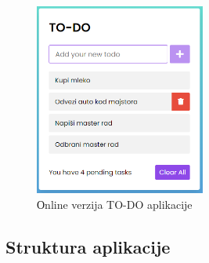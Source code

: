 \documentclass[12pt,oneside]{memoir}
\begin{document}
\begin{figure}[!ht]
  \centering
  \includegraphics[width=0.5\textwidth]{slike/todo-app-online.PNG}
  \caption{Оnline verzija TO-DO aplikacije}
  \label{fig:todo-app}
\end{figure}
\subsection{Struktura aplikacije}
\end{document}
